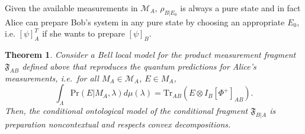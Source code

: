 \documentclass[DIV=calc,paper=a4,fontsize=11pt,twocolumn]{scrartcl} %
\theoremstyle{definition}
\theoremstyle{plain}
\newtheorem{theorem}[definition]{Theorem}
\newcommand{\Proj}[1]{\ensuremath{\left [ #1 \right ]}}
\begin{document}
Given the available measurements in $\mathcal{M}_A$, $\rho_{B|E_0}$ is
always a pure state and in fact Alice can prepare Bob's system in any
pure state by choosing an appropriate $E_0$, i.e. $\Proj{\psi}^T_A$ if
she wants to prepare $\Proj{\psi}_B$.

\begin{theorem}
\label{prop:Bell:PNC}
Consider a Bell local model for the product measurement fragment
$\mathfrak{F}_{AB}$ defined above that reproduces the quantum
predictions for Alice's measurements, i.e.\ for all $M_A \in
\mathcal{M}_A$, $E \in M_A$,
\begin{equation}
\int_{\Lambda} \mathrm{Pr}(E|M_A,\lambda)d\mu(\lambda) =
\mathrm{Tr}_{AB} \left ( E \otimes I_B \Proj{\Phi^+}_{AB} \right
).
\end{equation}
Then, the conditional ontological model of the conditional fragment
$\mathfrak{F}_{B|A}$ is preparation noncontextual and respects
convex decompositions.
\end{theorem}
\end{document}
